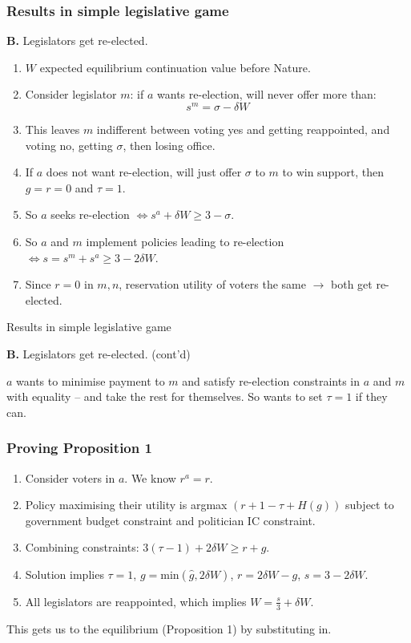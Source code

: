 \documentclass[11pt,aspectratio=169]{beamer}
\begin{document}
\begin{frame}
\frametitle{Results in simple legislative game}

\textbf{B.} Legislators get re-elected. 

\begin{enumerate}
\item $W$ expected equilibrium continuation value before Nature.
\item Consider legislator $m$: if $a$ wants re-election, will never offer more than:
$$ s^m = \sigma - \delta W$$
\item This leaves $m$ indifferent between voting yes and getting reappointed, and voting no, getting $\sigma$, then losing office.
\item If $a$ does not want re-election, will just offer $\sigma$ to $m$ to win support, then $g=r=0$ and $\tau=1$.
\item So $a$ seeks re-election $\Leftrightarrow s^a + \delta W \geq 3 - \sigma$.
\item So $a$ and $m$ implement policies leading to re-election $\Leftrightarrow s = s^m + s^a \geq 3 - 2\delta W$.
\item Since $r = 0$ in $m, n$, reservation utility of voters the same $\rightarrow$ both get re-elected.
\end{enumerate}

\end{frame}

\begin{frame}{Results in simple legislative game}

\textbf{B.} Legislators get re-elected. (cont'd)

$a$ wants to minimise payment to $m$ and satisfy re-election constraints in $a$ and $m$ with equality -- and take the rest for themselves. So wants to set $\tau = 1$ if they can.

\end{frame}

\begin{frame}\frametitle{Proving Proposition 1}

\begin{enumerate}
\item Consider voters in $a$. We know $r^a = r$.
\item Policy maximising their utility is argmax $(r + 1 - \tau + H(g))$ subject to government budget constraint and politician IC constraint.
\item Combining constraints: $3(\tau - 1) + 2\delta W \geq r + g$.
\item Solution implies $\tau = 1$, $g = \text{min}(\hat{g}, 2\delta W)$, $r = 2\delta W - g$, $s = 3 - 2\delta W$. 
\item All legislators are reappointed, which implies $W = \frac{s}{3} + \delta W$.
\end{enumerate}

This gets us to the equilibrium (Proposition 1) by substituting in.

\end{frame}
\end{document}
